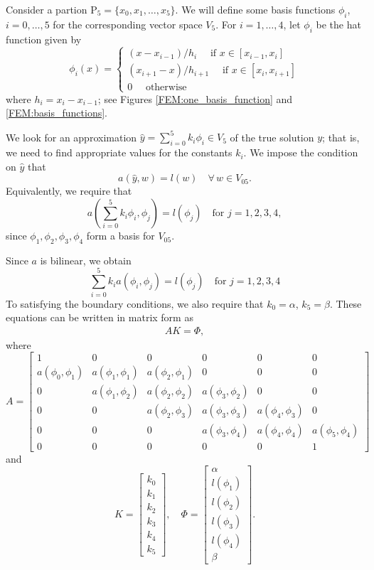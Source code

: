 Consider a partion $\mathrm{P}_5 = \{x_0, x_1, \ldots, x_5\}$. We will define some basis functions $\phi_i$, $i = 0, \ldots, 5$ for the corresponding vector space $V_5$. For $i = 1, \ldots, 4$, let $\phi_i$ be the hat function given by 
\[
\phi_i(x) = \begin{cases}
(x - x_{i-1})/h_i \quad \text{ if } x \in [x_{i-1},x_i]\\
 (x_{i+1} - x)/h_{i+1} \quad \text{ if } x \in [x_{i},x_{i+1}]\\
0 \quad \text{ otherwise}
\end{cases}
\]
where $h_i = x_i - x_{i-1}$; see Figures \ref{FEM:one_basis_function} and \ref{FEM:basis_functions}.

We look for an approximation $\hat{y} = \sum_{i=0}^5 k_i \phi_i \in V_5$ of the true solution $y$; that is, we need to find appropriate values for the constants $k_i$. We impose the condition on $\hat{y}$ that 
\[a(\hat{y},w) = l(w) \quad \forall \, w \in V_{05}.\]
Equivalently, we require that 
\[a \left( \sum_{i=0}^5 k_i \phi_i,\phi_j \right) = l(\phi_j) \quad \text{for } j = 1,2,3,4,\]
since $\phi_1, \phi_2, \phi_3, \phi_4$ form a basis for $V_{05}$.


Since $a$ is bilinear, we obtain 
\[
\sum_{i=0}^5 k_i  a ( \phi_i,\phi_j ) = l(\phi_j) \quad \text{for } j = 1,2,3,4
\]
To satisfying the boundary conditions, we also require that $k_0 = \alpha$, $k_5 = \beta$.
These equations can be written in matrix form as 
\begin{align} AK = \Phi,\label{FE:linear_system}\end{align}
where 
\[
A = \left[\begin{array}{cccccc}1 & 0 & 0 & 0 & 0 & 0 \\a(\phi_0,\phi_1) & a(\phi_1,\phi_1) & a(\phi_2,\phi_1) & 0 & 0 & 0 \\0 & a(\phi_1,\phi_2) & a(\phi_2,\phi_2) & a(\phi_3,\phi_2) & 0 & 0 \\0 & 0 & a(\phi_2,\phi_3) & a(\phi_3,\phi_3) & a(\phi_4,\phi_3) & 0 \\0 & 0 & 0 & a(\phi_3,\phi_4) & a(\phi_4,\phi_4) & a(\phi_5,\phi_4) \\0 & 0 & 0 & 0 & 0 &1\end{array}\right]
\]
and
\[
K = \left[\begin{array}{c}k_0 \\k_1 \\k_2 \\k_3 \\k_4 \\k_5\end{array}\right] , \quad\Phi =  \left[\begin{array}{c}\alpha \\l(\phi_1) \\l(\phi_2) \\l(\phi_3) \\l(\phi_4) \\\beta\end{array}\right] .
\]

